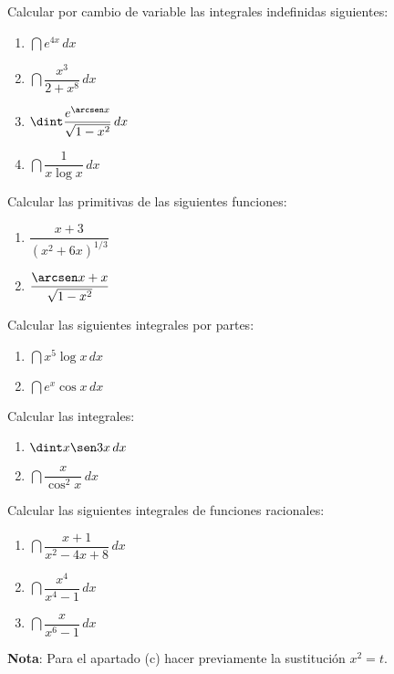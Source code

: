 
{Calcular por cambio de variable las integrales indefinidas siguientes:
\begin{multicols}{2}
\begin{enumerate}
\item $\dint e^{4x}\, dx$
\item $\dint \dfrac{x^{3}}{2+x^{8}}\, dx$
\item $\dint \dfrac{e^{\arcsen x}}{\sqrt{1-x^{2}}}\, dx$
\item $\dint \dfrac{1}{x\log x}\, dx$
\end{enumerate}
\end{multicols}
}


{Calcular las primitivas de las siguientes funciones:
\begin{multicols}{2}
\begin{enumerate}
\item $\dfrac{x+3}{\left( x^{2}+6x\right) ^{1/3}}$
\item $\dfrac{\arcsen x+x}{\sqrt{1-x^{2}}}$
\end{enumerate}
\end{multicols}
}


{Calcular las siguientes integrales por partes:
\begin{multicols}{2}
\begin{enumerate}
\item $\dint x^{5}\log x\, dx$
\item $\dint e^{x}\cos x\, dx$
\end{enumerate}
\end{multicols}
}


{Calcular las integrales:
\begin{multicols}{2}
\begin{enumerate}
\item $\dint x\sen 3x\,dx$
\item $\dint \dfrac{x}{\cos^{2}x}\,dx$
\end{enumerate}
\end{multicols}
}


{Calcular las siguientes integrales de funciones racionales:
\begin{multicols}{2}
\begin{enumerate}\setlength{\itemsep}{3mm}
\item $\dint \dfrac{x+1}{x^{2}-4x+8}\,dx$
\item $\dint \dfrac{x^{4}}{x^{4}-1}\,dx$
\item $\dint \dfrac{x}{x^{6}-1}\,dx$ 
\end{enumerate}
\end{multicols}
\textbf{Nota}: Para el apartado (c) hacer previamente la sustitución $x^{2}=t$.
}


